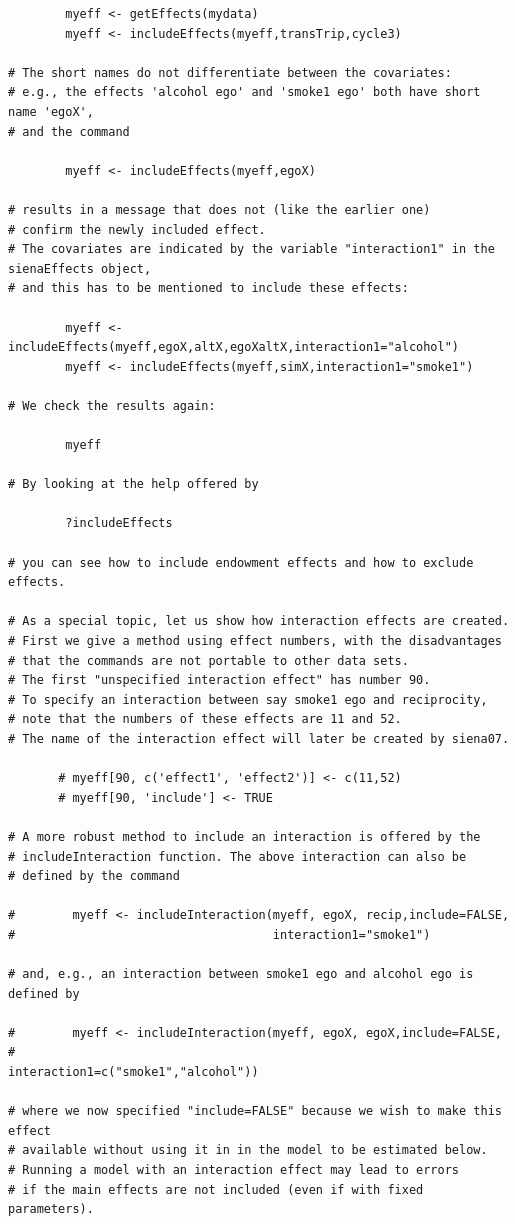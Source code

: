 \documentclass[a4paper,fleqn]{article}
\newcommand{\+}{\, + \,}
\begin{document}
{\begin{verbatim}
        myeff <- getEffects(mydata)
        myeff <- includeEffects(myeff,transTrip,cycle3)

# The short names do not differentiate between the covariates:
# e.g., the effects 'alcohol ego' and 'smoke1 ego' both have short name 'egoX',
# and the command

        myeff <- includeEffects(myeff,egoX)

# results in a message that does not (like the earlier one)
# confirm the newly included effect.
# The covariates are indicated by the variable "interaction1" in the sienaEffects object,
# and this has to be mentioned to include these effects:

        myeff <- includeEffects(myeff,egoX,altX,egoXaltX,interaction1="alcohol")
        myeff <- includeEffects(myeff,simX,interaction1="smoke1")

# We check the results again:

        myeff

# By looking at the help offered by

        ?includeEffects

# you can see how to include endowment effects and how to exclude effects.

# As a special topic, let us show how interaction effects are created.
# First we give a method using effect numbers, with the disadvantages
# that the commands are not portable to other data sets.
# The first "unspecified interaction effect" has number 90.
# To specify an interaction between say smoke1 ego and reciprocity,
# note that the numbers of these effects are 11 and 52.
# The name of the interaction effect will later be created by siena07.

       # myeff[90, c('effect1', 'effect2')] <- c(11,52)
       # myeff[90, 'include'] <- TRUE

# A more robust method to include an interaction is offered by the
# includeInteraction function. The above interaction can also be
# defined by the command

#        myeff <- includeInteraction(myeff, egoX, recip,include=FALSE,
#                                    interaction1="smoke1")

# and, e.g., an interaction between smoke1 ego and alcohol ego is defined by

#        myeff <- includeInteraction(myeff, egoX, egoX,include=FALSE,
#                                    interaction1=c("smoke1","alcohol"))

# where we now specified "include=FALSE" because we wish to make this effect
# available without using it in in the model to be estimated below.
# Running a model with an interaction effect may lead to errors
# if the main effects are not included (even if with fixed parameters).


\end{verbatim}}
\end{document}
